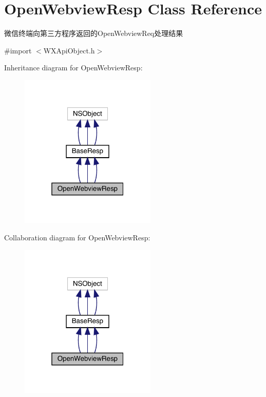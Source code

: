 \hypertarget{interface_open_webview_resp}{}\section{Open\+Webview\+Resp Class Reference}
\label{interface_open_webview_resp}


微信终端向第三方程序返回的\+Open\+Webview\+Req处理结果  




{\ttfamily \#import $<$W\+X\+Api\+Object.\+h$>$}



Inheritance diagram for Open\+Webview\+Resp\+:\nopagebreak
\begin{figure}[H]
\begin{center}
\leavevmode
\includegraphics[width=184pt]{interface_open_webview_resp__inherit__graph}
\end{center}
\end{figure}


Collaboration diagram for Open\+Webview\+Resp\+:\nopagebreak
\begin{figure}[H]
\begin{center}
\leavevmode
\includegraphics[width=184pt]{interface_open_webview_resp__coll__graph}
\end{center}
\end{figure}

